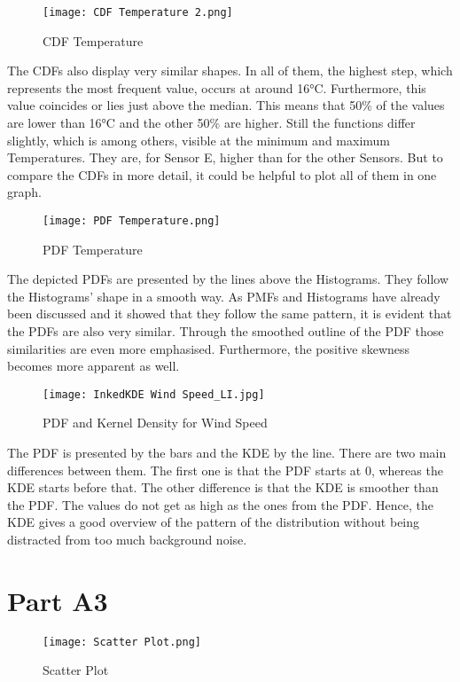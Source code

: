 \documentclass{article}
\begin{document}
\begin{figure} [H]
  \texttt{[image: CDF Temperature 2.png]}
  \caption{CDF Temperature}
  \label{fig:CDF}
\end{figure}

The CDFs also display very similar shapes. In all of them, the highest step, which represents the most frequent value, occurs at around 16°C. Furthermore, this value coincides or lies just above the median. This means that 50\% of the values are lower than 16°C and the other 50\% are higher. Still the functions differ slightly, which is among others, visible at the minimum and maximum Temperatures. They are, for Sensor E, higher than for the other Sensors. But to compare the CDFs in more detail, it could be helpful to plot all of them in one graph.



\begin{figure} [H]
  \texttt{[image: PDF Temperature.png]}
  \caption{PDF Temperature}
  \label{fig:PDF}
\end{figure}

The depicted PDFs are presented by the lines above the Histograms. They follow the Histograms’ shape in a smooth way. As PMFs and Histograms have already been discussed and it showed that they follow the same pattern, it is evident that the PDFs are also very similar. Through the smoothed outline of the PDF those similarities are even more emphasised. Furthermore, the positive skewness becomes more apparent as well.

\begin{figure} [H]
  \texttt{[image: InkedKDE Wind Speed\_LI.jpg]}
  \caption{PDF and Kernel Density for Wind Speed}
  \label{fig:KDE}
\end{figure}

The PDF is presented by the bars and the KDE by the line. There are two main differences between them. The first one is that the PDF starts at 0, whereas the KDE starts before that. The other difference is that the KDE is smoother than the PDF. The values do not get as high as the ones from the PDF. Hence, the KDE gives a good overview of the pattern of the distribution without being distracted from too much background noise. 

\section{Part A3}

\begin{figure} [H]
  \texttt{[image: Scatter Plot.png]}
  \caption{Scatter Plot}
  \label{fig:Scatter}
\end{figure}
\end{document}
